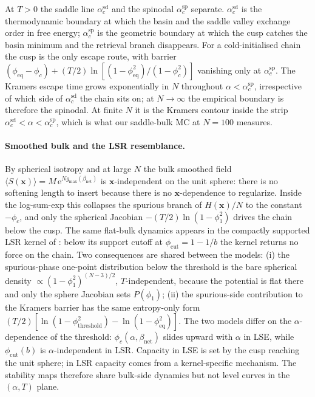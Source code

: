 \documentclass[11pt]{article}
\newcommand{\bx}{\bm{x}}
\newcommand{\avg}[1]{\langle #1 \rangle}
\newcommand{\e}{{\mathrm{e}}}
\newcommand{\Bnet}{\beta_{\mathrm{net}}}
\newcommand{\phieq}{\phi_{\mathrm{eq}}}
\newcommand{\gmax}{g_{\max}}
\newcommand{\acSd}{\alpha_c^{\mathrm{sd}}}
\newcommand{\acSp}{\alpha_c^{\mathrm{sp}}}
\begin{document}
At $T > 0$ the saddle line $\acSd$ and the spinodal $\acSp$ separate.
$\acSd$ is the thermodynamic boundary at which the basin and the saddle
valley exchange order in free energy; $\acSp$ is the geometric boundary
at which the cusp catches the basin minimum and the retrieval branch
disappears.  For a cold-initialised chain the cusp is the only escape
route, with barrier $(\phieq - \phi_c) + (T/2)\ln[(1 - \phieq^2)/
(1 - \phi_c^2)]$ vanishing only at $\acSp$.  The Kramers escape time
grows exponentially in $N$ throughout $\alpha < \acSp$, irrespective of
which side of $\acSd$ the chain sits on; at $N \to \infty$ the empirical
boundary is therefore the spinodal.  At finite $N$ it is the Kramers
contour inside the strip $\acSd < \alpha < \acSp$, which is what our
saddle-bulk MC at $N = 100$ measures.

\paragraph{Smoothed bulk and the LSR resemblance.}
By spherical isotropy and at large $N$ the bulk smoothed field
$\avg{S(\bx)} = M\,\e^{N\gmax(\Bnet)}$ is $\bx$-independent on the unit
sphere: there is no softening length to insert because there is no
$\bx$-dependence to regularize.  Inside the log-sum-exp this collapses
the spurious branch of $H(\bx)/N$ to the constant $-\phi_c$, and only the
spherical Jacobian $-(T/2)\ln(1 - \phi_1^2)$ drives the chain below the
cusp.  The same flat-bulk dynamics appears in the compactly supported LSR
kernel of \citet{petrova2026metastable}: below its support cutoff at
$\phi_{\mathrm{cut}} = 1 - 1/b$ the kernel returns no force on the chain.
Two consequences are shared between the models: (i) the spurious-phase
one-point distribution below the threshold is the bare spherical density
$\propto (1 - \phi_1^2)^{(N-3)/2}$, $T$-independent, because the potential
is flat there and only the sphere Jacobian sets $P(\phi_1)$; (ii) the
spurious-side contribution to the Kramers barrier has the same
entropy-only form $(T/2)[\ln(1 - \phi_{\mathrm{threshold}}^2) -
\ln(1 - \phi_{\mathrm{eq}}^2)]$.  The two models differ on the
$\alpha$-dependence of the threshold: $\phi_c(\alpha, \Bnet)$ slides
upward with $\alpha$ in LSE, while $\phi_{\mathrm{cut}}(b)$ is
$\alpha$-independent in LSR.  Capacity in LSE is set by the cusp reaching
the unit sphere; in LSR capacity comes from a kernel-specific mechanism.
The stability maps therefore share bulk-side dynamics but not level
curves in the $(\alpha, T)$ plane.
\end{document}
